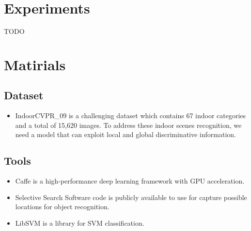 \documentclass[letterpaper,twocolumn,11pt]{article}
\begin{document}
\section{Experiments}
TODO

\section{Matirials}
	\subsection{Dataset}
	\begin{itemize}
	\item{IndoorCVPR\_09} is a challenging dataset which contains 67
	indoor categories and a total of 15,620 images. To address these indoor
	scenes recognition, we need a model	that can exploit local and global
	discriminative information.\cite{DATA}
	\end{itemize}
	\subsection{Tools}
	\begin{itemize}
	\item{Caffe} is a high-performance deep learning framework with GPU
	acceleration. \cite{CAFFE}

	\item{Selective Search Software} code is publicly available to use
	for capture possible locations for object recognition. \cite{SS}

	\item{LibSVM} is a library for SVM classification. \cite{SVM}
	\end{itemize}
\end{document}
